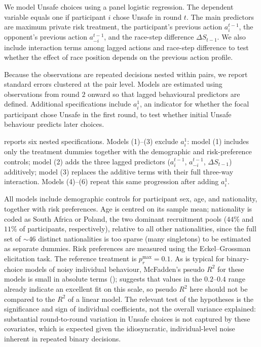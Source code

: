 \documentclass[pdflatex,sn-mathphys-ay]{sn-jnl}
\theoremstyle{thmstyleone}
\theoremstyle{thmstyletwo}
\theoremstyle{thmstylethree}
\begin{document}
We model Unsafe choices using a panel logistic regression. The dependent variable equals one if participant \(i\) chose Unsafe in round \(t\). The main predictors are maximum private risk treatment, the participant's previous action \(a_i^{t-1}\), the opponent's previous action \(a_{-i}^{t-1}\), and the race-step difference \(\Delta S_{t-1}\). We also include interaction terms among lagged actions and race-step difference to test whether the effect of race position depends on the previous action profile.

Because the observations are repeated decisions nested within pairs, we report standard errors clustered at the pair level. Models are estimated using observations from round \(2\) onward so that lagged behavioural predictors are defined. Additional specifications include \(a_i^1\), an indicator for whether the focal participant chose Unsafe in the first round, to test whether initial Unsafe behaviour predicts later choices.

 reports six nested specifications. Models (1)--(3) exclude \(a_i^1\): model (1) includes only the treatment dummies together with the demographic and risk-preference controls; model (2) adds the three lagged predictors (\(a_i^{t-1}\), \(a_{-i}^{t-1}\), \(\Delta S_{t-1}\)) additively; model (3) replaces the additive terms with their full three-way interaction. Models (4)--(6) repeat this same progression after adding \(a_i^1\).

All models include demographic controls for participant sex, age, and nationality, together with risk preferences. Age is centred on its sample mean; nationality is coded as South Africa or Poland, the two dominant recruitment pools (\(44\%\) and \(11\%\) of participants, respectively), relative to all other nationalities, since the full set of \(\sim\!46\) distinct nationalities is too sparse (many singletons) to be estimated as separate dummies. Risk preferences are measured using the Eckel--Grossman elicitation task. The reference treatment is \(p_r^{\max}=0.1\). As is typical for binary-choice models of noisy individual behaviour, McFadden's pseudo \(R^2\) for these models is small in absolute terms (); \citet{mcfadden1974conditional} suggests that values in the \(0.2\)--\(0.4\) range already indicate an excellent fit on this scale, so pseudo \(R^2\) here should not be compared to the \(R^2\) of a linear model. The relevant test of the hypotheses is the significance and sign of individual coefficients, not the overall variance explained: substantial round-to-round variation in Unsafe choices is not captured by these covariates, which is expected given the idiosyncratic, individual-level noise inherent in repeated binary decisions.
\end{document}
